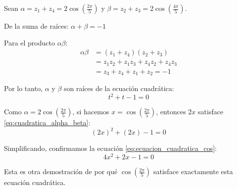 Sean $\alpha = z_1 + z_4 = 2\cos\left(\frac{2\pi}{5}\right)$ y $\beta = z_2 + z_3 = 2\cos\left(\frac{4\pi}{5}\right)$.

De la suma de raíces: $\alpha + \beta = -1$

Para el producto $\alpha \beta$:
\begin{align}
\alpha \beta &= (z_1 + z_4)(z_2 + z_3) \\
&= z_1 z_2 + z_1 z_3 + z_4 z_2 + z_4 z_3 \\
&= z_3 + z_4 + z_1 + z_2 = -1
\end{align}

Por lo tanto, $\alpha$ y $\beta$ son raíces de la ecuación cuadrática:
\begin{equation}\label{eq:cuadratica_alpha_beta}
t^2 + t - 1 = 0
\end{equation}

Como $\alpha = 2\cos\left(\frac{2\pi}{5}\right)$, si hacemos $x = \cos\left(\frac{2\pi}{5}\right)$, entonces $2x$ satisface \eqref{eq:cuadratica_alpha_beta}:
\begin{equation}\label{eq:sustitucion_2x}
(2x)^2 + (2x) - 1 = 0
\end{equation}

Simplificando, confirmamos la ecuación \eqref{eq:ecuacion_cuadratica_cos}:
\begin{equation}\label{eq:confirmacion_ecuacion}
4x^2 + 2x - 1 = 0
\end{equation}

Esta es otra demostración de por qué $\cos\left(\frac{2\pi}{5}\right)$ satisface exactamente esta ecuación cuadrática.
